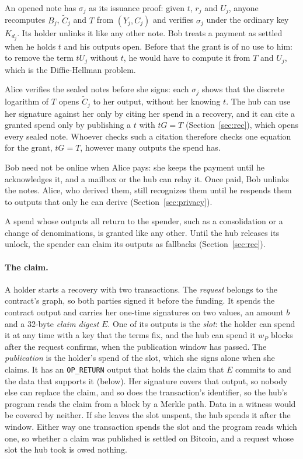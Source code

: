 \documentclass[11pt]{article}
\makeatletter
\renewcommand\section{\@startsection{section}{1}{\z@}{-2.5ex plus -1ex minus -.2ex}{1.2ex plus .2ex}{\large\bfseries}}
\newcommand{\wP}{w_P}
\makeatother
\begin{document}
An opened note has $\sigma_j$ as its issuance proof: given $t$, $r_j$ and $U_j$, anyone recomputes $B_j$, $\tilde C_j$ and $T$ from $(Y_j,C_j)$ and verifies $\sigma_j$ under the ordinary key $K_{d_j}$. Its holder unlinks it like any other note. Bob treats a payment as settled when he holds $t$ and his outputs open. Before that the grant is of no use to him: to remove the term $tU_j$ without $t$, he would have to compute it from $T$ and $U_j$, which is the Diffie-Hellman problem.

Alice verifies the sealed notes before she signs: each $\sigma_j$ shows that the discrete logarithm of $T$ opens $\tilde C_j$ to her output, without her knowing $t$. The hub can use her signature against her only by citing her spend in a recovery, and it can cite a granted spend only by publishing a $t$ with $tG=T$ (Section~\ref{sec:rec}), which opens every sealed note. Whoever checks such a citation therefore checks one equation for the grant, $tG=T$, however many outputs the spend has.

Bob need not be online when Alice pays: she keeps the payment until he acknowledges it, and a mailbox or the hub can relay it. Once paid, Bob unlinks the notes. Alice, who derived them, still recognizes them until he respends them to outputs that only he can derive (Section~\ref{sec:privacy}).

A spend whose outputs all return to the spender, such as a consolidation or a change of denominations, is granted like any other. Until the hub releases its unlock, the spender can claim its outputs as fallbacks (Section~\ref{sec:rec}).

\section{Recovery}
\label{sec:rec}

\paragraph{The claim.} A holder starts a recovery with two transactions. The \emph{request} belongs to the contract's graph, so both parties signed it before the funding. It spends the contract output and carries her one-time signatures on two values, an amount $b$ and a 32-byte \emph{claim digest} $E$. One of its outputs is the \emph{slot}: the holder can spend it at any time with a key that the terms fix, and the hub can spend it $\wP$ blocks after the request confirms, when the publication window has passed. The \emph{publication} is the holder's spend of the slot, which she signs alone when she claims. It has an \texttt{OP\_RETURN} output that holds the claim that $E$ commits to and the data that supports it (below). Her signature covers that output, so nobody else can replace the claim, and so does the transaction's identifier, so the hub's program reads the claim from a block by a Merkle path. Data in a witness would be covered by neither. If she leaves the slot unspent, the hub spends it after the window. Either way one transaction spends the slot and the program reads which one, so whether a claim was published is settled on Bitcoin, and a request whose slot the hub took is owed nothing.
\end{document}
